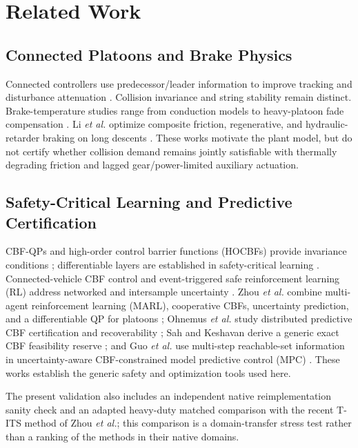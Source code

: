 \section{Related Work}
\subsection{Connected Platoons and Brake Physics}
Connected controllers use predecessor/leader information to improve tracking and disturbance attenuation \cite{naus2010string,ploeg2011cacc}. Collision invariance and string stability remain distinct. Brake-temperature studies range from conduction models \cite{talati2009brake} to heavy-platoon fade compensation \cite{devika2022fade}. Li \emph{et al.} optimize composite friction, regenerative, and hydraulic-retarder braking on long descents \cite{li2025retarder}. These works motivate the plant model, but do not certify whether collision demand remains jointly satisfiable with thermally degrading friction and lagged gear/power-limited auxiliary actuation.

\subsection{Safety-Critical Learning and Predictive Certification}
CBF-QPs and high-order control barrier functions (HOCBFs) provide invariance conditions \cite{ames2017cbf,xiao2022hocbf}; differentiable layers are established in safety-critical learning \cite{ma2022differentiable,xiao2023barriernet,yang2023diffcbf}. Connected-vehicle CBF control and event-triggered safe reinforcement learning (RL) address networked and intersample uncertainty \cite{li2025connectedcbf,hu2025event}. Zhou \emph{et al.} combine multi-agent reinforcement learning (MARL), cooperative CBFs, uncertainty prediction, and a differentiable QP for platoons \cite{zhou2026cooperative}; Ohnemus \emph{et al.} study distributed predictive CBF certification and recoverability \cite{ohnemus2026dpcbf}; Sah and Keshavan derive a generic exact CBF feasibility reserve \cite{sah2026exact}; and Guo \emph{et al.} use multi-step reachable-set information in uncertainty-aware CBF-constrained model predictive control (MPC) \cite{guo2025uncertainty}. These works establish the generic safety and optimization tools used here.

The present validation also includes an independent native reimplementation sanity check and an adapted heavy-duty matched comparison with the recent T-ITS method of Zhou \emph{et al.}; this comparison is a domain-transfer stress test rather than a ranking of the methods in their native domains.

